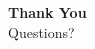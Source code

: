 \documentclass[aspectratio=169,xcolor=dvipsnames]{beamer}
\begin{document}






%     
%     


\begin{frame}
    \centering
    {\Huge \textbf{Thank You}} \\[1.5em]
    {\LARGE Questions?}
\end{frame}

\end{document}
